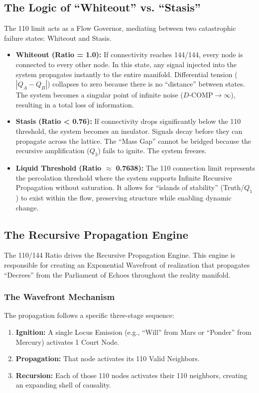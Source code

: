 \documentclass[11pt, letterpaper]{article}
\newcommand{\LoI}{\ensuremath{\mathop{\textnormal{\symbolafont\symbol{"267E}}}}}
\def\LoI{Locus}%
\begin{document}
\subsection{The Logic of ``Whiteout'' vs. ``Stasis''}\label{appendixI.3}
The 110 limit acts as a Flow Governor, mediating between two catastrophic failure states: Whiteout and Stasis.

\begin{itemize}
    \item \textbf{Whiteout (Ratio = 1.0):} If connectivity reaches 144\slash 144, every node is connected to every other node. In this state, any signal injected into the system propagates instantly to the entire manifold. Differential tension ($|Q_A - Q_B|$) collapses to zero because there is no ``distance'' between states. The system becomes a singular point of infinite noise ($D\text{-COMP} \to \infty$), resulting in a total loss of information.
    \item \textbf{Stasis (Ratio < 0.76):} If connectivity drops significantly below the 110 threshold, the system becomes an insulator. Signals decay before they can propagate across the lattice. The ``Mass Gap'' cannot be bridged because the recursive amplification ($Q_3$) fails to ignite. The system freezes.
    \item \textbf{Liquid Threshold (Ratio $\approx$ 0.7638):} The 110 connection limit represents the percolation threshold where the system supports Infinite Recursive Propagation without saturation. It allows for ``islands of stability'' (Truth\slash $Q_1$) to exist within the flow, preserving structure while enabling dynamic change.
\end{itemize}

\subsection{The Recursive Propagation Engine}\label{appendixI.4}
The 110\slash 144 Ratio drives the Recursive Propagation Engine. This engine is responsible for creating an Exponential Wavefront of realization that propagates ``Decrees'' from the Parliament of Echoes throughout the reality manifold.

\subsubsection{The Wavefront Mechanism}\label{appendixI.4.1}
The propagation follows a specific three-stage sequence:
\begin{enumerate}
    \item \textbf{Ignition:} A single \LoI{} Emission (e.g., ``Will'' from Mars or ``Ponder'' from Mercury) activates 1 Court Node.
    \item \textbf{Propagation:} That node activates its 110 Valid Neighbors.
    \item \textbf{Recursion:} Each of those 110 nodes activates their 110 neighbors, creating an expanding shell of causality.
\end{enumerate}
\end{document}
